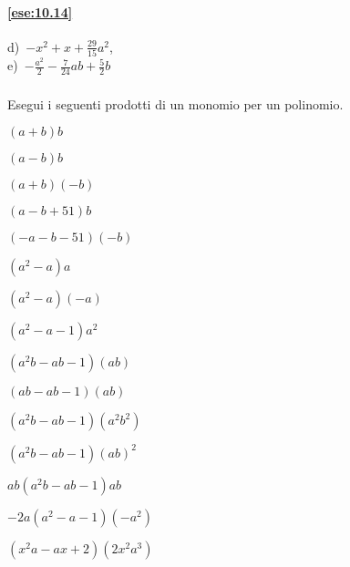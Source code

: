 \paragraph{\ref{ese:10.14}} d)~$-x^{2}+x+\frac{29}{15}a^{2}$,\protect\\ 
e)~$-{\frac{a^{2}}{2}}-\frac{7}{24}ab+\frac{5}{2}b$

\subsubsection*{}

\begin{esercizio}
\label{ese:10.15}
 Esegui i seguenti prodotti di un monomio per un polinomio.
 \begin{multicols}{3}
\begin{enumeratea}
 \item $(a + b)b$
 \item $(a - b)b$
 \item $(a +b)(-b)$
 \item $(a - b + 51)b$
 \item $(-a - b -51)(-b)$
 \item $(a^{2} - a)a$
 \item $(a^{2} - a)(-a)$
 \item $(a^{2}- a - 1)a^{2}$
 \item $(a^{2}b-ab - 1)(ab)$
 \item $(ab- ab - 1)(ab)$
 \item $(a^{2}b- ab -1)(a^{2}b^{2})$
 \item $(a^{2}b-ab - 1)(ab)^{2}$
 \item $ab(a^{2}b- ab -1)ab$
 \item $-2a(a^{2} - a - 1)(-a^{2})$
 \item $(x^{2}a- ax+2)(2x^{2}a^{3})$
\end{enumeratea}
\end{multicols}
\end{esercizio}

